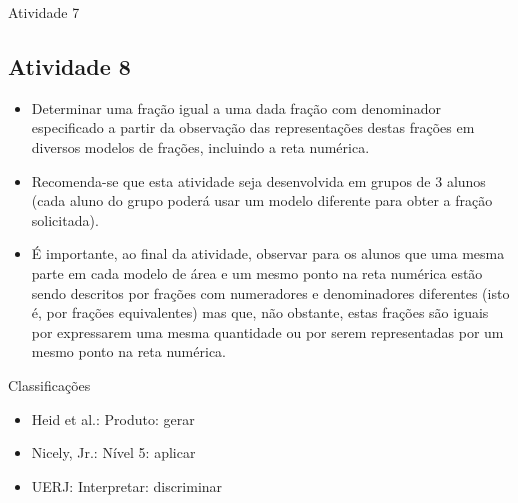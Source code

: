 \begin{multicols}{2}
\begin{resposta*}{Atividade 7}
  
\end{resposta*}

\Bg
\Bg
\Bg

\subsection{Atividade 8}

\begin{itemize} %
    \item       Determinar uma fração igual a uma dada fração com denominador 
especificado a partir da observação das representações destas frações em 
diversos modelos de frações, incluindo a reta numérica.
\end{itemize} %
  
 
\begin{itemize} %
    \item       Recomenda-se que esta atividade seja desenvolvida em grupos de 3 
alunos (cada aluno do grupo poderá usar um modelo diferente para obter a fração 
solicitada).
    \item       É importante, ao final da atividade, observar para os alunos que 
uma mesma parte em cada modelo de área e um mesmo ponto na reta numérica estão 
sendo descritos por frações com numeradores e denominadores diferentes (isto é, 
por frações equivalentes) mas que, não obstante, estas frações são iguais por 
expressarem uma mesma quantidade ou por serem representadas por um mesmo ponto 
na reta numérica. 
\end{itemize} %
  
  Classificações  
\begin{itemize} %
    \item       Heid et al.: Produto: gerar
    \item       Nicely, Jr.: Nível 5: aplicar
    \item       UERJ: Interpretar: discriminar
\end{itemize} %


\end{multicols}
